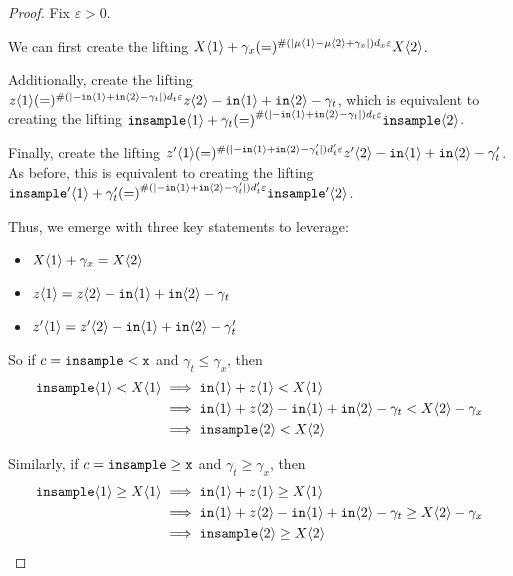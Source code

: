 \begin{proof}
Fix $\varepsilon>0$.

We can first create the lifting $X\brangle{1}+\gamma_x (=)^{\#(|\mu\brangle{1}-\mu\brangle{2}+\gamma_x|)d_x\varepsilon}X\brangle{2}$. 

Additionally, create the lifting $z\brangle{1} (=)^{\#(|-\texttt{in}\brangle{1}+\texttt{in}\brangle{2}-\gamma_t|)d_t\varepsilon}z\brangle{2} - \texttt{in}\brangle{1}+\texttt{in}\brangle{2}-\gamma_t$, which is equivalent to creating the lifting $\texttt{insample}\brangle{1} +\gamma_t{(=)}^{\#(|-\texttt{in}\brangle{1}+\texttt{in}\brangle{2}-\gamma_t|)d_t\varepsilon}\texttt{insample}\brangle{2}$.

Finally, create the lifting $z'\brangle{1} (=)^{\#(|-\texttt{in}\brangle{1}+\texttt{in}\brangle{2}-\gamma_t'|)d_t'\varepsilon}z'\brangle{2} - \texttt{in}\brangle{1}+\texttt{in}\brangle{2}-\gamma_t'$. As before, this is equivalent to creating the lifting $\texttt{insample}'\brangle{1} +\gamma_t'{(=)}^{\#(|-\texttt{in}\brangle{1}+\texttt{in}\brangle{2}-\gamma_t'|)d_t'\varepsilon}\texttt{insample}'\brangle{2}$.

Thus, we emerge with three key statements to leverage:\begin{itemize}
    \item $X\brangle{1} + \gamma_x = X\brangle{2}$
    \item $z\brangle{1} = z\brangle{2} - \texttt{in}\brangle{1}+\texttt{in}\brangle{2}-\gamma_t$
    \item $z'\brangle{1} = z'\brangle{2} - \texttt{in}\brangle{1}+\texttt{in}\brangle{2}-\gamma_t'$
\end{itemize}

So if $c=\lguard[\texttt{x}]$ and $\gamma_t\leq \gamma_x$, then \begin{align*}
    \texttt{insample}\brangle{1}<X\brangle{1}&\implies \texttt{in}\brangle{1}+z\brangle{1}<X\brangle{1}\\
    &\implies \texttt{in}\brangle{1}+z\brangle{2}-\texttt{in}\brangle{1}+\texttt{in}\brangle{2}-\gamma_t<X\brangle{2}-\gamma_x\\
    &\implies \texttt{insample}\brangle{2}<X\brangle{2}
\end{align*}

Similarly, if $c=\gguard[\texttt{x}]$ and $\gamma_t\geq \gamma_x$, then \begin{align*}
    \texttt{insample}\brangle{1}\geq X\brangle{1}&\implies \texttt{in}\brangle{1}+z\brangle{1}\geq X\brangle{1}\\
    &\implies \texttt{in}\brangle{1}+z\brangle{2}-\texttt{in}\brangle{1}+\texttt{in}\brangle{2}-\gamma_t\geq X\brangle{2}-\gamma_x\\
    &\implies \texttt{insample}\brangle{2}\geq X\brangle{2}
\end{align*}


\end{proof}

